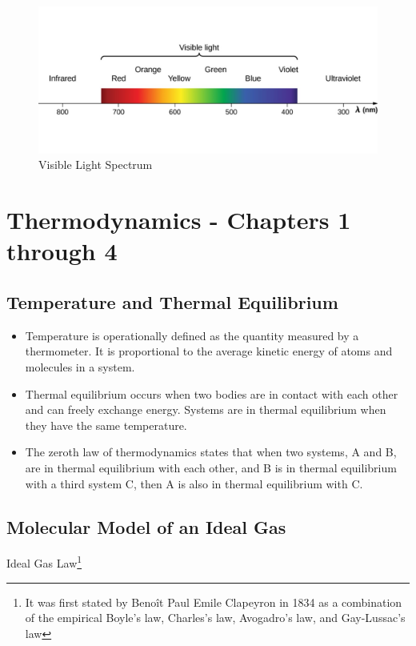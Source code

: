 \documentclass[14pt]{memoir}
\begin{document}
\begin{figure}[H]
\begin{center}
\includegraphics[scale=0.5]{fig/fig_16_20.jpg}
\caption{Visible Light Spectrum}
\label{fig:16_20}
\end{center}
\end{figure}

\chapter{Thermodynamics - Chapters 1 through 4}

\section{Temperature and Thermal Equilibrium}

\begin{itemize}
\item Temperature is operationally defined as the quantity measured by a thermometer. It is proportional to the average kinetic energy of atoms and molecules in a system.
\item Thermal equilibrium occurs when two bodies are in contact with each other and can freely exchange energy. Systems are in thermal equilibrium when they have the same temperature.
\item The zeroth law of thermodynamics states that when two systems, A and B, are in thermal equilibrium with each other, and B is in thermal equilibrium with a third system C, then A is also in thermal equilibrium with C.
\end{itemize}

\section{Molecular Model of an Ideal Gas}

Ideal Gas Law\footnote{It was first stated by Benoît Paul Emile Clapeyron in 1834 as a combination of the empirical Boyle's law, Charles's law, Avogadro's law, and Gay-Lussac's law}
\end{document}
